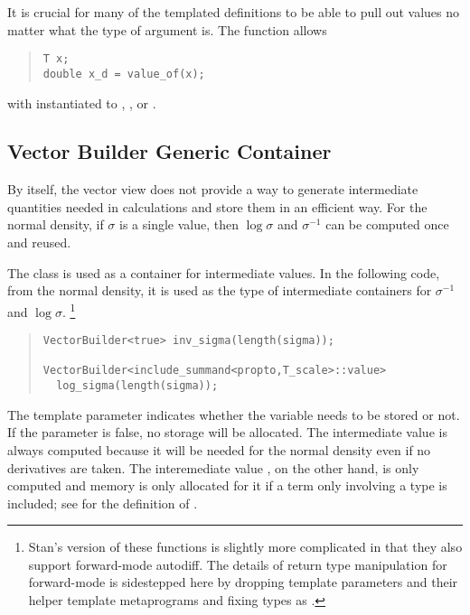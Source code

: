 \documentclass[10pt]{article}
\begin{document}
It is crucial for many of the templated definitions to be able to pull
out  values no matter what the type of argument is.  
The function  allows
%
\begin{quote}
\begin{Verbatim}
T x;
double x_d = value_of(x);
\end{Verbatim}
\end{quote}
%
with  instantiated to , , or
.  

\subsection{Vector Builder Generic Container}

By itself, the vector view does not provide a way to generate
intermediate quantities needed in calculations and store them in an
efficient way.  For the normal density, if $\sigma$ is a single value,
then $\log \sigma$ and $\sigma^{-1}$ can be computed once and reused.

The class  is used as a container for intermediate
values.  In the following code, from the normal density, it is used as
the type of intermediate containers for $\sigma^{-1}$ and $\log
\sigma$.%
%
\footnote{Stan's version of these functions is slightly more
  complicated in that they also support forward-mode autodiff.  The
  details of return type manipulation for forward-mode is sidestepped
  here by dropping template parameters and their helper template
  metaprograms and fixing types as .}
%
\begin{quote}
\begin{Verbatim}
VectorBuilder<true> inv_sigma(length(sigma));

VectorBuilder<include_summand<propto,T_scale>::value>
  log_sigma(length(sigma));
\end{Verbatim}
\end{quote}
%
The template parameter indicates whether the variable needs to be
stored or not.  If the parameter is false, no storage will be
allocated.  The intermediate value  is always
computed because it will be needed for the normal density even if no
derivatives are taken.  The interemediate value , on
the other hand, is only computed and memory is only allocated for it
if a term only involving a type  is included; see
 for the definition of
.
\end{document}
